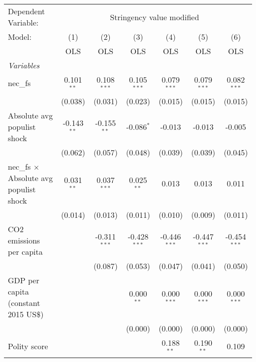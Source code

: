
\begingroup
\centering
\begin{tabular}{lcccccc}
   \toprule
   Dependent Variable: & \multicolumn{6}{c}{Stringency value modified}\\
   Model:                                         & (1)           & (2)            & (3)            & (4)            & (5)            & (6)\\  
                                                  &  OLS          & OLS            & OLS            & OLS            & OLS            & OLS\\  
   \midrule
   \emph{Variables}\\
   nec\_fs                                        & 0.101$^{**}$  & 0.108$^{***}$  & 0.105$^{***}$  & 0.079$^{***}$  & 0.079$^{***}$  & 0.082$^{***}$\\   
                                                  & (0.038)       & (0.031)        & (0.023)        & (0.015)        & (0.015)        & (0.015)\\   
   Absolute avg populist shock                    & -0.143$^{**}$ & -0.155$^{**}$  & -0.086$^{*}$   & -0.013         & -0.013         & -0.005\\   
                                                  & (0.062)       & (0.057)        & (0.048)        & (0.039)        & (0.039)        & (0.045)\\   
   nec\_fs $\times$ Absolute avg populist shock   & 0.031$^{**}$  & 0.037$^{***}$  & 0.025$^{**}$   & 0.013          & 0.013          & 0.011\\   
                                                  & (0.014)       & (0.013)        & (0.011)        & (0.010)        & (0.009)        & (0.011)\\   
   CO2 emissions per capita                       &               & -0.311$^{***}$ & -0.428$^{***}$ & -0.446$^{***}$ & -0.447$^{***}$ & -0.454$^{***}$\\   
                                                  &               & (0.087)        & (0.053)        & (0.047)        & (0.041)        & (0.050)\\   
   GDP per capita (constant 2015 US\$)            &               &                & 0.000$^{**}$   & 0.000$^{***}$  & 0.000$^{***}$  & 0.000$^{***}$\\   
                                                  &               &                & (0.000)        & (0.000)        & (0.000)        & (0.000)\\   
   Polity score                                   &               &                &                & 0.188$^{**}$   & 0.190$^{**}$   & 0.109\\   

\end{tabular}
